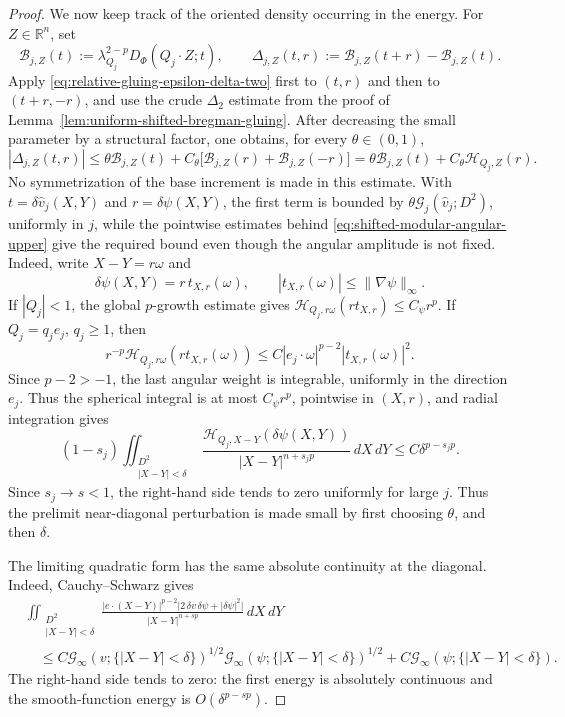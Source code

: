 \documentclass[11pt,reqno]{amsart}
\numberwithin{equation}{section}
\newcommand{\R}{\mathbb R}
\newcommand{\dd}{\,d}
\theoremstyle{remark}
\begin{document}
\begin{proof}
We now keep track of the oriented density occurring in the energy.  For
\(Z\in\R^n\), set
\begin{equation*}
 \mathcal B_{j,Z}(t):=\lambda_{Q_j}^{2-p}
 D_\Phi(Q_j\cdot Z;t),\qquad
 \Delta_{j,Z}(t,r):=\mathcal B_{j,Z}(t+r)-\mathcal B_{j,Z}(t).
\end{equation*}
Apply \eqref{eq:relative-gluing-epsilon-delta-two} first to \((t,r)\)
and then to \((t+r,-r)\), and use the crude \(\Delta_2\) estimate from
the proof of Lemma~\ref{lem:uniform-shifted-bregman-gluing}.  After
decreasing the small parameter by a structural factor, one obtains, for
every \(\theta\in(0,1)\),
\begin{equation}
 |\Delta_{j,Z}(t,r)|
 \le\theta\mathcal B_{j,Z}(t)
 +C_\theta\bigl[\mathcal B_{j,Z}(r)+\mathcal B_{j,Z}(-r)\bigr]
 =\theta\mathcal B_{j,Z}(t)+C_\theta\mathcal H_{Q_j,Z}(r).
 \label{eq:oriented-bregman-perturbation-bound}
\end{equation}
No symmetrization of the base increment is made in this estimate.  With
\(t=\delta\widehat v_j(X,Y)\) and
\(r=\delta\psi(X,Y)\), the first term is bounded by
\(\theta\mathscr G_j(\widehat v_j;D^2)\), uniformly in \(j\), while
the pointwise estimates behind
\eqref{eq:shifted-modular-angular-upper} give the required bound even
though the angular amplitude is not fixed.  Indeed, write
\(X-Y=r\omega\) and
\[
 \delta\psi(X,Y)=r\,t_{X,r}(\omega),
 \qquad |t_{X,r}(\omega)|\le\|\nabla\psi\|_\infty.
\]
If \(|Q_j|<1\), the global \(p\)-growth estimate gives
\(\mathcal H_{Q_j,r\omega}(rt_{X,r})\le C_\psi r^p\).  If
\(Q_j=q_je_j\), \(q_j\ge1\), then
\[
 r^{-p}\mathcal H_{Q_j,r\omega}(rt_{X,r}(\omega))
 \le C|e_j\cdot\omega|^{p-2}|t_{X,r}(\omega)|^2.
\]
Since \(p-2>-1\), the last angular weight is integrable, uniformly in
the direction \(e_j\).  Thus the spherical integral is at most
\(C_\psi r^p\), pointwise in \((X,r)\), and radial integration gives
\[
 (1-s_j)\iint_{\substack{D^2\\|X-Y|<\delta}}
 \frac{\mathcal H_{Q_j,X-Y}(\delta\psi(X,Y))}
 {|X-Y|^{n+s_jp}}\dd X\!\dd Y
 \le C\delta^{p-s_jp}.
\]
Since \(s_j\to s<1\), the right-hand side tends to zero uniformly for
large \(j\).  Thus the prelimit near-diagonal perturbation is made small
by first choosing \(\theta\), and then \(\delta\).

The limiting quadratic form has the same absolute continuity at the
diagonal.  Indeed, Cauchy--Schwarz gives
\begin{align*}
 &\iint_{\substack{D^2\\|X-Y|<\delta}}
 \frac{|e\cdot(X-Y)|^{p-2}
 \bigl|2\,\delta v\,\delta\psi+|\delta\psi|^2\bigr|}
 {|X-Y|^{n+sp}}\dd X\!\dd Y\\
 &\quad\le C
 \mathscr G_\infty(v;\{|X-Y|<\delta\})^{1/2}
 \mathscr G_\infty(\psi;\{|X-Y|<\delta\})^{1/2}
 +C\mathscr G_\infty(\psi;\{|X-Y|<\delta\}).
\end{align*}
The right-hand side tends to zero: the first energy is absolutely
continuous and the smooth-function energy is
\(O(\delta^{p-sp})\).


\end{proof}
\end{document}
